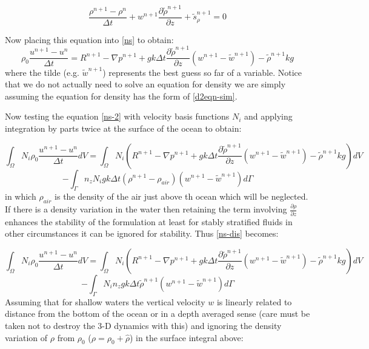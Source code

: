 \begin{equation}
\frac{\rho^{n+1} -\rho^n}{\Delta t} 
+ w^{n+1} \frac{\partial {\tilde \rho}^{n+1}}{\partial z} +  {\tilde s}_\rho^{n+1}=0 
\label{d2eqn-sim}
\end{equation}

Now placing this equation into \ref{ns} to obtain:
\begin{equation}
\rho_0 \frac{u^{n+1}- u^n}{\Delta t}= R^{n+1} - \nabla p^{n+1} 
+ g k \Delta t \frac{\partial {\tilde \rho}^{n+1}}{\partial z} (w^{n+1}- {\tilde w}^{n+1})
- {\tilde \rho}^{n+1} k g 
\label{ns-2}
\end{equation}
where the tilde (e.g. ${\tilde w}^{n+1}$) represents the best guess so far of a variable. 
Notice that we do not actually need to solve an equation for density we are 
simply assuming the equation for density has the form of \ref{d2eqn-sim}. 

Now testing the equation \ref{ns-2} with velocity basis functions 
$N_i$ and applying integration by parts twice at the surface 
of the ocean to obtain:

\begin{equation}
\int_\Omega N_i \rho_0 \frac{u^{n+1}- u^n}{\Delta t} d V= 
\int_\Omega N_i (R^{n+1} - \nabla p^{n+1} 
+ g k \Delta t \frac{\partial {\tilde \rho}^{n+1}}{\partial z} (w^{n+1}- {\tilde w}^{n+1})
- {\tilde \rho}^{n+1} k g ) dV
\end{equation}
\begin{equation}
- \int_\Gamma n_z N_i g k \Delta t (\rho^{n+1}-\rho_{air})(w^{n+1}-\tilde
w^{n+1}) d\Gamma
\label{ns-dis-b}
\end{equation}
in which $\rho_{air}$ is the density of the air just above th ocean 
which will be neglected. If there is a density variation in the water 
then retaining the term involving $\frac{\partial \rho}{\partial z}$ 
enhances the stability of the formulation at least for stably stratified 
fluids in other circumstances it can be ignored for stability. 
Thus \ref{ns-dis} becomes:

\begin{equation}
\int_\Omega N_i \rho_0 \frac{u^{n+1}- u^n}{\Delta t} d V= 
\int_\Omega N_i (R^{n+1} - \nabla p^{n+1} 
+ g k \Delta t \frac{\partial {\tilde \rho}^{n+1}}{\partial z} (w^{n+1}- {\tilde w}^{n+1})
- {\tilde \rho}^{n+1} k g ) dV
\end{equation}
\begin{equation}
- \int_\Gamma N_i n_z g k \Delta t {\tilde \rho}^{n+1}(w^{n+1}-\tilde
w^{n+1}) d\Gamma
\label{ns-dis-2-b}
\end{equation}
Assuming that for shallow waters the vertical velocity $w$ 
is linearly related to distance from the bottom of the ocean 
or in a depth averaged sense (care must be taken not to destroy the 
3-D dynamics with this) and ignoring the density variation of $\rho$ 
from $\rho_0$ ($\rho=\rho_0+\hat \rho$) in the surface integral above: 

